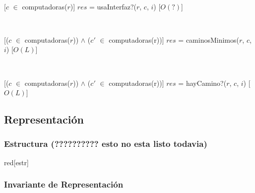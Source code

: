   ~

  [$c$ $\in$ computadoras($r$)]
  {$res$ = usaInterfaz?($r$, $c$, $i$)}
  [$O(?)$]

  ~

  [($c$ $\in$ computadoras($r$)) $\land$ ($c'$ $\in$ computadoras(r))]
  {$res$ = caminosMinimos($r$, $c$, $i$)}
  [$O(L)$]

  ~

  [($c$ $\in$ computadoras($r$)) $\land$ ($c'$ $\in$ computadoras(r))]
  {$res$ = hayCamino?($r$, $c$, $i$)}
  [$O(L)$]


\subsection{Representación}

  \subsubsection{Estructura (?????????? esto no esta listo todavia)}

    \begin{Estructura}{red}[estr]

      \begin{Tupla}[estr]
      \end{Tupla}

      \begin{Tupla}[nodoRed]
      \end{Tupla}

    \end{Estructura}

\subsubsection{Invariante de Representación}




